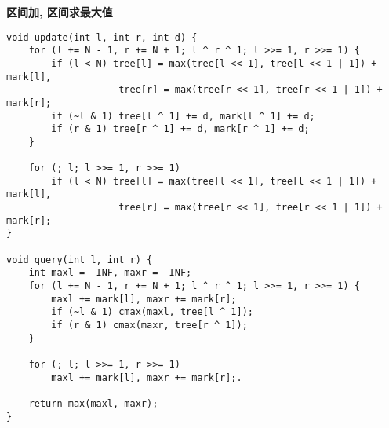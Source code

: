 \textbf{区间加, 区间求最大值}
\begin{verbatim}
void update(int l, int r, int d) {
    for (l += N - 1, r += N + 1; l ^ r ^ 1; l >>= 1, r >>= 1) {
        if (l < N) tree[l] = max(tree[l << 1], tree[l << 1 | 1]) + mark[l],
                    tree[r] = max(tree[r << 1], tree[r << 1 | 1]) + mark[r];
        if (~l & 1) tree[l ^ 1] += d, mark[l ^ 1] += d;
        if (r & 1) tree[r ^ 1] += d, mark[r ^ 1] += d;
    }

    for (; l; l >>= 1, r >>= 1)
        if (l < N) tree[l] = max(tree[l << 1], tree[l << 1 | 1]) + mark[l],
                    tree[r] = max(tree[r << 1], tree[r << 1 | 1]) + mark[r];
}

void query(int l, int r) {
    int maxl = -INF, maxr = -INF;
    for (l += N - 1, r += N + 1; l ^ r ^ 1; l >>= 1, r >>= 1) {
        maxl += mark[l], maxr += mark[r];
        if (~l & 1) cmax(maxl, tree[l ^ 1]);
        if (r & 1) cmax(maxr, tree[r ^ 1]);
    }

    for (; l; l >>= 1, r >>= 1)
        maxl += mark[l], maxr += mark[r];.
        
    return max(maxl, maxr);
}
\end{verbatim}